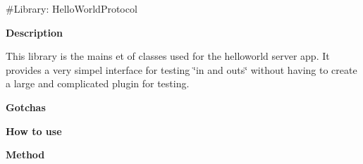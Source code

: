 \#\+Library\+: Hello\+World\+Protocol

{\bfseries{Description}}

This library is the mains et of classes used for the helloworld server app. It provides a very simpel interface for testing \char`\"{}in and outs\char`\"{} without having to create a large and complicated plugin for testing.

{\bfseries{Gotchas}}

{\bfseries{How to use}}

{\bfseries{Method}} 